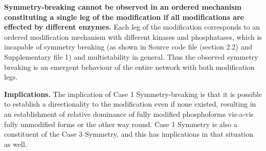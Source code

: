 \documentclass[9pt,lineno]{elife}
\begin{document}
{\bf Symmetry-breaking cannot be observed in an ordered mechanism constituting a single leg of the modification if all modifications are effected by different enzymes.} Each leg of the modification corresponds to an ordered modification mechanism with different kinases and phosphatases, which is incapable of symmetry breaking (as shown in Source code file (section 2.2) and Supplementary file 1) and multistability in general. Thus the observed symmetry breaking is an emergent behaviour of the entire network with both modification legs.

{\bf Implications.} The implication of Case 1 Symmetry-breaking is that it is possible to establish a directionality to the 
modification even if none existed, resulting in an establishment of relative dominance of fully modified phosphoforms vis-a-vis fully unmodified forms or the other way round. Case 1 Symmetry is also a constituent of the Case 3 Symmetry, and this  has implications in that situation as well.
\end{document}
